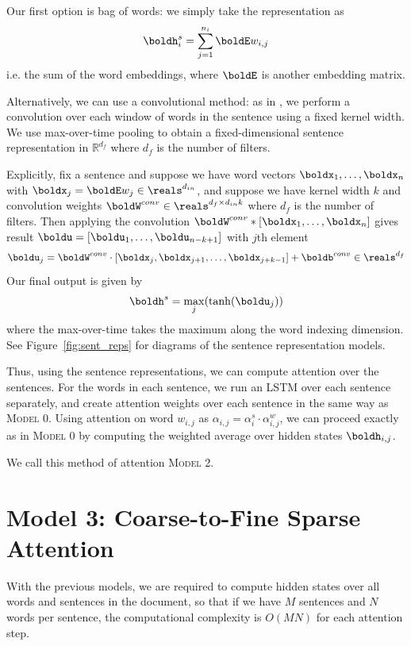 \documentclass[12pt]{report}
\begin{document}
Our first option is bag of words: we simply take the representation as
\begin{equation}
\boldh_i^s = \sum_{j=1}^{n_i} \boldE w_{i,j}
\end{equation}
i.e. the sum of the word embeddings, where $\boldE$ is another embedding matrix.

Alternatively, we can use a convolutional method: as in \citet{kim2014convolutional}, we perform a convolution over each window of words in the sentence using a fixed kernel width. We use max-over-time pooling to obtain a fixed-dimensional sentence representation in $\mathbb{R}^{d_f}$ where $d_f$ is the number of filters.

Explicitly, fix a sentence and suppose we have word vectors $\boldx_1, \ldots, \boldx_n$ with $\boldx_j = \boldE w_j \in \reals^{d_{in}}$, and suppose we have kernel width $k$ and convolution weights $\boldW^{conv} \in \reals^{d_f \times d_{in} k}$ where $d_f$ is the number of filters. Then applying the convolution
$\boldW^{conv} * [\boldx_1, \ldots, \boldx_n]$ gives result $\boldu = [\boldu_1, \ldots, \boldu_{n-k+1}]$ with $j$th element
$$\boldu_j = \boldW^{conv} \cdot [\boldx_j, \boldx_{j+1}, \ldots, \boldx_{j+k-1}] + \boldb^{conv} \in \reals^{d_f}$$
Our final output is given by 
\begin{equation}
\boldh^s = \max_j(\tanh(\boldu_j))
\end{equation}
where the max-over-time takes the maximum along the word indexing dimension. See Figure~\ref{fig:sent_reps} for diagrams of the sentence representation models.


Thus, using the sentence representations, we can compute attention over the sentences.
For the words in each sentence, we run an LSTM over each sentence separately, and create attention weights over each sentence in the same way as \textsc{Model 0}. Using attention on word $w_{i,j}$ as  $\alpha_{i,j} = \alpha_i^s \cdot \alpha_{i,j}^w$, we can proceed exactly as in \textsc{Model 0} by computing the weighted average over hidden states $\boldh_{i,j}$.

We call this method of attention \textsc{Model 2}.

\section{Model 3: Coarse-to-Fine Sparse Attention}

With the previous models, we are required to compute hidden states over all words and sentences in the document, so that if we have $M$ sentences and $N$ words per sentence, the computational complexity is $O(MN)$ for each attention step.
\end{document}
